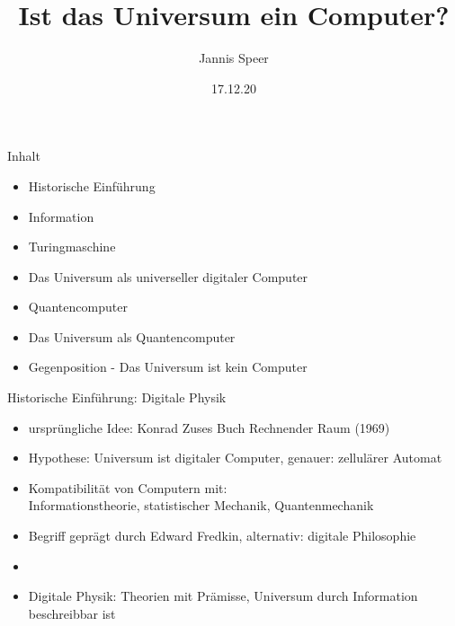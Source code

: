 \documentclass[aspectratio=1610, 9pt]{beamer}
\title{Ist das Universum ein Computer?}
\author[J.~Speer]{Jannis Speer}
\date{17.12.20}
\institute{Big Questions Seminar}
\begin{document}
\maketitle

\begin{frame}{Inhalt}
  \begin{itemize}
    \item Historische Einführung
    \item Information
    \item Turingmaschine
    \item Das Universum als universeller digitaler Computer
    \item Quantencomputer
    \item Das Universum als Quantencomputer
    \item Gegenposition - Das Universum ist kein Computer
  \end{itemize}
\end{frame}


\begin{frame}{Historische Einführung: Digitale Physik}
  \begin{itemize}
    \item ursprüngliche Idee: Konrad Zuses Buch Rechnender Raum (1969)
    \item Hypothese: Universum ist digitaler Computer, genauer: zellulärer Automat
    \item Kompatibilität von Computern mit: \\Informationstheorie, statistischer Mechanik, Quantenmechanik
    \item Begriff geprägt durch  Edward Fredkin, alternativ: digitale Philosophie
    \item[]
    \item[\rightarrow] Digitale Physik: Theorien mit Prämisse, Universum durch Information beschreibbar ist
  \end{itemize}
\end{frame}
\end{document}
